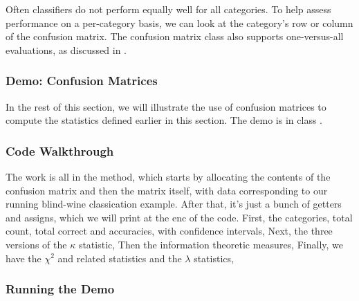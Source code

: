 Often classifiers do not perform equally well for all categories.  To
help assess performance on a per-category basis, we can look at the
category's row or column of the confusion matrix.  The confusion
matrix class also supports one-versus-all evaluations, as
discussed in .


\subsubsection{Demo: Confusion Matrices}

In the rest of this section, we will illustrate the use of confusion
matrices to compute the statistics defined earlier in this section.
The demo is in class .

\subsubsection{Code Walkthrough}

The work is all in the  method, which starts by
allocating the contents of the confusion matrix and then the matrix
itself, with data corresponding to our running blind-wine classication
example.
%
%
After that, it's just a bunch of getters and assigns, which we will
print at the enc of the code.  First, the categories, total count,
total correct and accuracies, with confidence intervals,
%
%
Next, the three versions of the $\kappa$ statistic,
%
%
Then the information theoretic measures,
%
%
Finally, we have the $\chi^2$ and related statistics and the $\lambda$ statistics,
%


\subsubsection{Running the Demo}

